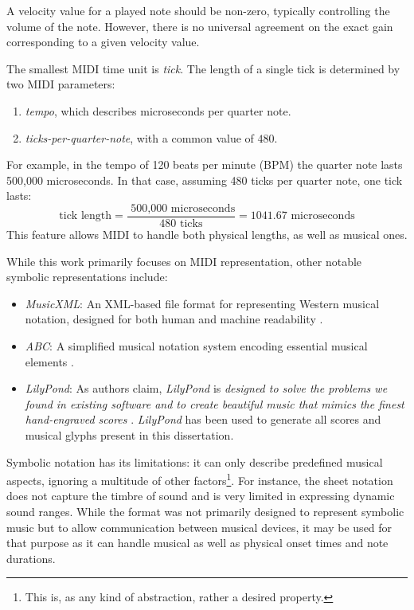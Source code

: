 A velocity value for a played note should be non-zero, typically controlling the volume of the note. However, there is no universal agreement on the exact gain corresponding to a given velocity value.

The smallest MIDI time unit is \emph{tick}. The length of a single tick is determined by two MIDI parameters:
\begin{enumerate}
	\item \emph{tempo}, which describes microseconds per quarter note.
	\item \emph{ticks-per-quarter-note}, with a common value of $480$.
\end{enumerate}

For example, in the tempo of 120 beats per minute (BPM) the quarter note lasts 500,000 microseconds. In that case, assuming 480 ticks per quarter note, one tick lasts: $$\textrm{tick length} = \frac{\text{ 500,000 microseconds}}{\text{480 ticks}} = 1041.67 \text{ microseconds}$$ This feature allows MIDI to handle both physical lengths, as well as musical ones. 

While this work primarily focuses on MIDI representation, other notable symbolic representations include:
\begin{itemize}
   \item \emph{MusicXML}: An XML-based file format for representing Western musical notation, designed for both human and machine readability \cite{Good2001}.
   \item \emph{ABC}: A simplified musical notation system encoding essential musical elements \cite{ABC2013}.
   \item \emph{LilyPond}: As authors claim, \emph{LilyPond} is \emph{designed to solve the problems we found in existing software and to create beautiful music that mimics the finest hand-engraved scores} \cite{LilyPond2002}. \emph{LilyPond} has been used to generate all scores and musical glyphs present in this dissertation.
\end{itemize}

Symbolic notation has its limitations: it can only describe predefined musical aspects, ignoring a multitude of other factors\footnote{This is, as any kind of abstraction, rather a desired property.}. For instance, the sheet notation does not capture the timbre of sound and is very limited in expressing dynamic sound ranges. While the format was not primarily designed to represent symbolic music but to allow communication between musical devices, it may be used for that purpose as it can handle 	musical as well as physical onset times and note durations\cite{Grohganz2014}.

